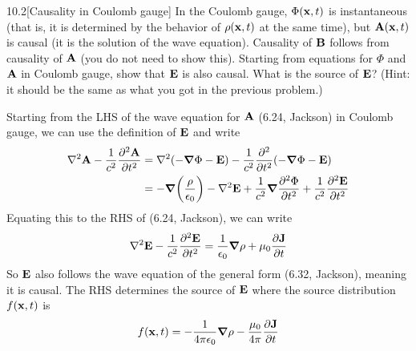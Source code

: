 \documentclass[12pt]{article}
\begin{document}
\begin{problem}{10.2}[Causality in Coulomb gauge]
In the Coulomb gauge, $\Phi(\vb{x},t)$ is instantaneous (that is, it is
determined by the behavior of $\rho(\vb{x},t)$ at the same time), but
$\vb{A}(\vb{x},t)$ is causal (it is the solution of the wave equation).
Causality of $\vb{B}$ follows from causality of $\vb{A}$ (you do not need to
show this). Starting from equations for $\Phi$ and $\vb{A}$ in Coulomb gauge,
show that $\vb{E}$ is also causal. What is the source of $\vb{E}$? (Hint: it
should be the same as what you got in the previous problem.)
\begin{solution}
Starting from the LHS of the wave equation for $\vb{A}$ (6.24, Jackson) in 
Coulomb gauge, we can use the definition of $\vb{E}$ and write
\begin{align}
    \laplacian{\vb{A}}
    -\frac1{c^2}\frac{\partial^2\vb{A}}{\partial t^2}
    &=\laplacian\qty(-\grad\Phi-\vb{E})
-\frac1{c^2}\frac{\partial^2}{\partial t^2}\qty(-\grad\Phi-\vb{E})\notag\\
    &=-\grad\qty(\frac{\rho}{\epsilon_0})-\laplacian\vb{E}
    +\frac1{c^2}\grad\frac{\partial^2\Phi}{\partial t^2}
    +\frac1{c^2}\frac{\partial^2\vb{E}}{\partial t^2}
\end{align}
Equating this to the RHS of (6.24, Jackson), we can write
\begin{equation}
    \laplacian\vb{E}-\frac1{c^2}\frac{\partial^2\vb{E}}{\partial t^2}
    =\frac1{\epsilon_0}\grad\rho+\mu_0\frac{\partial\vb{J}}{\partial t}
\end{equation}
So $\vb{E}$ also follows the wave equation of the general form (6.32, Jackson),
meaning it is causal. The RHS determines the source of $\vb{E}$ where the source
distribution $f(\vb{x},t)$ is
\begin{equation} 
    f(\vb{x},t)=-\frac1{4\pi\epsilon_0}\grad\rho-\frac{\mu_0}{4\pi}\frac{\partial\vb{J}}{\partial
    t}
\end{equation}
\end{solution}
\end{problem}
\end{document}
